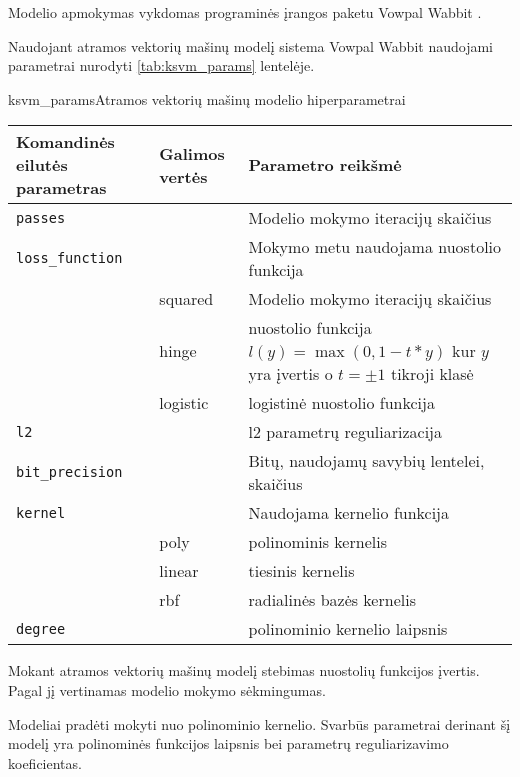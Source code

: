 
Modelio apmokymas vykdomas programinės įrangos paketu Vowpal Wabbit \cite{vw}.


Naudojant atramos vektorių mašinų modelį sistema Vowpal Wabbit naudojami parametrai nurodyti \vref{tab:ksvm_params} lentelėje.

\begin{ktutable}{ksvm_params}{Atramos vektorių mašinų modelio hiperparametrai}
    \begin{tabular}{| l | l | p{7cm}|}
    \hline
        Komandinės eilutės parametras & Galimos vertės & Parametro reikšmė\\ \hline
        \texttt{passes} &  & Modelio mokymo iteracijų skaičius \\ \hline
        \texttt{loss\_function} &          & Mokymo metu naudojama nuostolio funkcija \\
                               & squared  & Modelio mokymo iteracijų skaičius \\
                               & hinge    & nuostolio funkcija $l(y) = \max(0, 1 - t * y)$ kur $y$ yra įvertis o $t = \pm 1$ tikroji klasė  \\
                               & logistic & logistinė nuostolio funkcija \\ \hline
        \texttt{l2} & & l2 parametrų reguliarizacija \\ \hline
        \texttt{bit\_precision} & & Bitų, naudojamų savybių lentelei, skaičius\\ \hline
        \texttt{kernel} & & Naudojama kernelio funkcija   \\
                       & poly & polinominis kernelis     \\
                       & linear & tiesinis kernelis      \\
                       & rbf & radialinės bazės kernelis \\ \hline
        \texttt{degree} & & polinominio kernelio laipsnis \\ \hline
    \end{tabular}
\end{ktutable}

Mokant atramos vektorių mašinų modelį stebimas nuostolių funkcijos įvertis. Pagal jį
vertinamas modelio mokymo sėkmingumas.

Modeliai pradėti mokyti nuo polinominio kernelio. Svarbūs parametrai derinant šį modelį yra polinominės
funkcijos laipsnis bei parametrų reguliarizavimo koeficientas.

